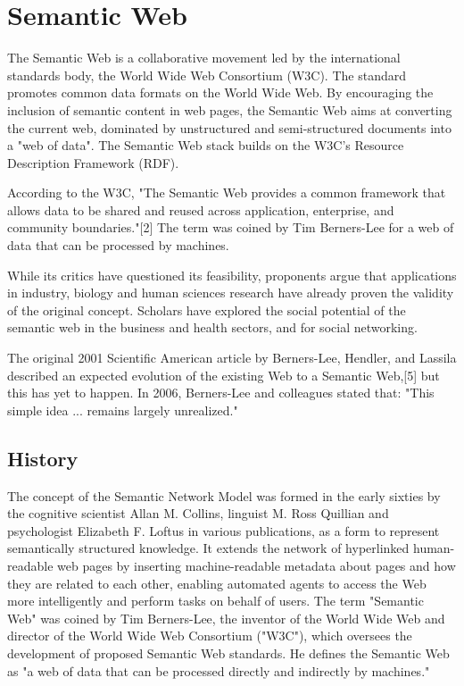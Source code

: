 \chapter{Semantic Web}

The Semantic Web is a collaborative movement led by the international standards body, the World Wide Web Consortium (W3C). The standard promotes common data formats on the World Wide Web. By encouraging the inclusion of semantic content in web pages, the Semantic Web aims at converting the current web, dominated by unstructured and semi-structured documents into a "web of data". The Semantic Web stack builds on the W3C's Resource Description Framework (RDF).

According to the W3C, "The Semantic Web provides a common framework that allows data to be shared and reused across application, enterprise, and community boundaries."[2] The term was coined by Tim Berners-Lee for a web of data that can be processed by machines.

While its critics have questioned its feasibility, proponents argue that applications in industry, biology and human sciences research have already proven the validity of the original concept. Scholars have explored the social potential of the semantic web in the business and health sectors, and for social networking.

The original 2001 Scientific American article by Berners-Lee, Hendler, and Lassila described an expected evolution of the existing Web to a Semantic Web,[5] but this has yet to happen. In 2006, Berners-Lee and colleagues stated that: "This simple idea ... remains largely unrealized."


\section{History}

The concept of the Semantic Network Model was formed in the early sixties by the cognitive scientist Allan M. Collins, linguist M. Ross Quillian and psychologist Elizabeth F. Loftus in various publications, as a form to represent semantically structured knowledge. It extends the network of hyperlinked human-readable web pages by inserting machine-readable metadata about pages and how they are related to each other, enabling automated agents to access the Web more intelligently and perform tasks on behalf of users. The term "Semantic Web" was coined by Tim Berners-Lee, the inventor of the World Wide Web and director of the World Wide Web Consortium ("W3C"), which oversees the development of proposed Semantic Web standards. He defines the Semantic Web as "a web of data that can be processed directly and indirectly by machines."

